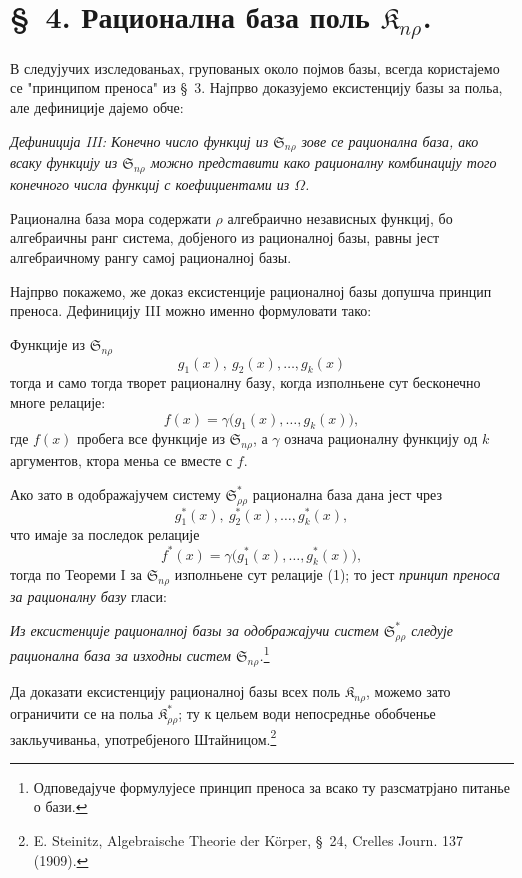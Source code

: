 ﻿\documentclass[11pt]{article}
\providecommand{\Kfield}{\mathfrak{K}}
\providecommand{\Ssys}{\mathfrak{S}}
\begin{document}
\section*{\S\ 4. Рационална база поль $\Kfield_{n\rho}$.}

В следујучих изследованьах, групованых около појмов базы, всегда користајемо се "принципом преноса" из \S\ 3. Најпрво доказујемо ексистенцију базы за польа, але дефиниције дајемо обче:

{\itshape Дефиниција III: Конечно число функциј из $\Ssys_{n\rho}$ зове се рационална база, ако всаку функцију из $\Ssys_{n\rho}$ можно представити како рационалну комбинацију того конечного числа функциј с коефициентами из $\Omega$.}

Рационална база мора содержати $\rho$ алгебраично независных функциј, бо алгебраичны ранг система, добјеного из рационалној базы, равны јест алгебраичному рангу самој рационалној базы.

Најпрво покажемо, же доказ ексистенције рационалној базы допушча принцип преноса. Дефиницију III можно именно формуловати тако:

Функције из $\Ssys_{n\rho}$
\[
  g_1(x),\ g_2(x),\ldots, g_k(x)
\]
тогда и само тогда творет рационалну базу, когда изполньене сут бесконечно многе релације:
\begin{equation}
  f(x)=\gamma\bigl(g_1(x),\ldots,g_k(x)\bigr),
\tag{1}
\end{equation}
где $f(x)$ пробега все функције из $\Ssys_{n\rho}$, а $\gamma$ означа рационалну функцију од $k$ аргументов, ктора меньа се вместе с $f$.

Ако зато в одображајучем систему $\Ssys^*_{\rho\rho}$ рационална база дана јест чрез
\[
  g_1^*(x),\ g_2^*(x),\ldots, g_k^*(x),
\]
что имаје за последок релације
\[
  f^*(x)=\gamma\bigl(g_1^*(x),\ldots,g_k^*(x)\bigr),
\]
тогда по Теореми I за $\Ssys_{n\rho}$ изполньене сут релације (1); то јест {\itshape принцип преноса за рационалну базу} гласи:

{\itshape Из ексистенције рационалној базы за одображајучи систем $\Ssys^*_{\rho\rho}$ следује рационална база за изходны систем $\Ssys_{n\rho}$.}\footnote{Одповедајуче формулујесе принцип преноса за всако ту разсматрјано питанье о бази.}

Да доказати ексистенцију рационалној базы всех поль $\Kfield_{n\rho}$, можемо зато ограничити се на польа $\Kfield^*_{\rho\rho}$; ту к цельем води непосреднье обобченье закльучиваньа, употребјеного Штайницом.\footnote{E. Steinitz, Algebraische Theorie der Körper, \S\ 24, Crelles Journ. 137 (1909).}
\end{document}
